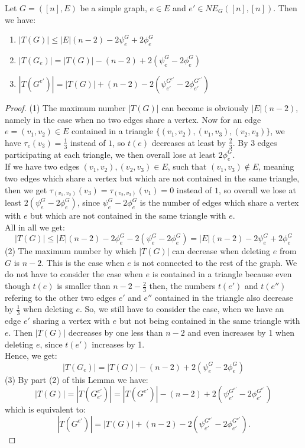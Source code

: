 \begin{lem}\label{lemma1}
Let \(G=([n],E)\) be a simple graph, \(e\in E\) and \(e'\in NE_G([n],[n])\). Then we have:
\begin{enumerate}
\item \(|T(G)|\leq |E|(n-2)-2\psi_e^G+2\phi_e^G\)
\item \(|T(G_e)|=|T(G)|-(n-2)+2(\psi_e^G-2\phi_e^G)\)
\item \(|T(G^{e'})|=|T(G)|+(n-2)-2(\psi_{e'}^{G^{e'}}-2\phi_{e'}^{G^{e'}})\)
\end{enumerate}
\begin{proof}
(1) The maximum number \(|T(G)|\) can become is obviously \(|E|(n-2)\), namely in the case when no two edges share a vertex. Now for an edge\\
\(e=(v_1,v_2)\in E\) contained in a triangle \(\{(v_1,v_2),(v_1,v_3),(v_2,v_3)\}\), we have \(\tau_e(v_3)=\frac{1}{3}\) instead of \(1\), so \(t(e)\) decreases at least by \(\frac{2}{3}\).
By 3 edges participating at each triangle, we then overall lose at least \(2\phi_e^G\).\\
If we have two edges \((v_1,v_2),(v_2,v_3)\in E\), such that \((v_1,v_3)\notin E\), meaning two edges which share a vertex but which are not contained in the same triangle, then we get \(\tau_{(v_1,v_2)}(v_3)=\tau_{(v_2,v_3)}(v_1)=0\) instead of \(1\), so overall we lose at least \(2(\psi_e^G-2\phi_e^G)\), since \(\psi_e^G-2\phi_e^G\) is the number of edges which share a vertex with \(e\) but which are not contained in the same triangle with \(e\).\\
All in all we get:
\[
|T(G)|\leq|E|(n-2)-2\phi_e^G-2(\psi_e^G-2\phi_e^G)=|E|(n-2)-2\psi_e^G+2\phi_e^G
\]
(2) The maximum number by which \(|T(G)|\) can decrease when deleting \(e\) from \(G\) is \(n-2\). This is the case when \(e\) is not connected to the rest of the graph. We do not have to consider the case when \(e\) is contained in a triangle because even though \(t(e)\) is smaller than \(n-2-\frac{2}{3}\) then, the numbers \(t(e')\) and \(t(e'')\) refering to the other two edges \(e'\) and \(e''\) contained in the triangle also decrease by \(\frac{1}{3}\) when deleting \(e\).
So, we still have to consider the case, when we have an edge \(e'\) sharing a vertex with \(e\) but not being contained in the same triangle with \(e\). Then \(|T(G)|\) decreases by one less than \(n-2\) and even increases by 1 when deleting \(e\), since \(t(e')\) increases by 1.\\
Hence, we get:
\[
|T(G_e)|=|T(G)|-(n-2)+2(\psi_e^G-2\phi_e^G)
\]
(3) By part (2) of this Lemma we have:
\[
|T(G)|=|T(G_{e'}^{e'})|=|T(G^{e'})|-(n-2)+2(\psi_{e'}^{G^{e'}}-2\phi_{e'}^{G^{e'}})
\]
which is equivalent to:
\[
|T(G^{e'})|=|T(G)|+(n-2)-2(\psi_{e'}^{G^{e'}}-2\phi_{e'}^{G^{e'}}).
\]
\end{proof}
\end{lem}

